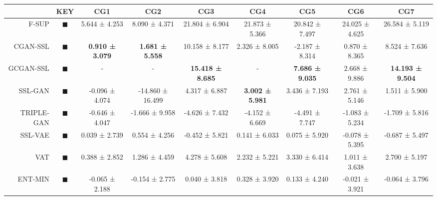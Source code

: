 \begin{tabular}{rcccccccc}
\toprule
{} &                                                                      KEY &                     CG1 &                     CG2 &                      CG3 &                     CG4 &                     CG5 &                     CG6 &                      CG7 \\
\midrule
F-SUP      &           \textcolor{FULLY_SUPERVISED_CLASSIFIER}{\LARGE $\blacksquare$} &           5.644 ± 4.253 &           8.090 ± 4.371 &           21.804 ± 6.904 &          21.873 ± 5.366 &          20.842 ± 7.497 &          24.025 ± 4.625 &           26.584 ± 5.119 \\
CGAN-SSL   &   \textcolor{CGAN_BASIC_DJ_SUPERVISED_CLASSIFIER}{\LARGE $\blacksquare$} &  \textbf{0.910 ± 3.079} &  \textbf{1.681 ± 5.558} &           10.158 ± 8.177 &           2.326 ± 8.005 &          -2.187 ± 8.314 &           0.870 ± 8.365 &            8.524 ± 7.636 \\
GCGAN-SSL  &  \textcolor{CGAN_GUMBEL_DJ_SUPERVISED_CLASSIFIER}{\LARGE $\blacksquare$} &               - &               - &  \textbf{15.418 ± 8.685} &               - &  \textbf{7.686 ± 9.035} &           2.668 ± 9.886 &  \textbf{14.193 ± 9.504} \\
SSL-GAN    &                               \textcolor{SSL_GAN}{\LARGE $\blacksquare$} &          -0.096 ± 4.074 &        -14.860 ± 16.499 &            4.317 ± 6.887 &  \textbf{3.002 ± 5.981} &           3.436 ± 7.193 &           2.761 ± 5.146 &            1.511 ± 5.900 \\
TRIPLE-GAN &                            \textcolor{TRIPLE_GAN}{\LARGE $\blacksquare$} &          -0.646 ± 4.047 &          -1.666 ± 9.958 &           -4.626 ± 7.432 &          -4.152 ± 6.669 &          -4.491 ± 7.747 &          -1.083 ± 5.234 &           -1.709 ± 5.816 \\
SSL-VAE    &                               \textcolor{SSL_VAE}{\LARGE $\blacksquare$} &           0.039 ± 2.739 &           0.554 ± 4.256 &           -0.452 ± 5.821 &           0.141 ± 6.033 &           0.075 ± 5.920 &          -0.078 ± 5.395 &           -0.687 ± 5.497 \\
VAT        &                                   \textcolor{VAT}{\LARGE $\blacksquare$} &           0.388 ± 2.852 &           1.286 ± 4.459 &            4.278 ± 5.608 &           2.232 ± 5.221 &           3.330 ± 6.414 &           1.011 ± 3.638 &            2.700 ± 5.197 \\
ENT-MIN    &                  \textcolor{ENTROPY_MINIMISATION}{\LARGE $\blacksquare$} &          -0.065 ± 2.188 &          -0.154 ± 2.775 &            0.040 ± 3.818 &           0.328 ± 3.920 &           0.133 ± 4.240 &          -0.021 ± 3.921 &           -0.064 ± 3.796 \\

\end{tabular}
